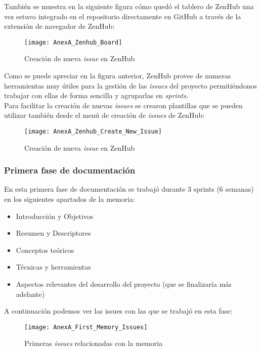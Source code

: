 También se muestra en la siguiente figura cómo quedó el tablero de ZenHub una vez estuvo integrado en el repositorio directamente en GitHub a través de la extensión de navegador de ZenHub:

\begin{figure}[!h]
	\centering
	\texttt{[image: AnexA\_Zenhub\_Board]}
	\caption{Creación de nueva \textit{issue} en ZenHub}
	\label{fig:AnexA_Zenhub_Board}
\end{figure}
\FloatBarrier

Como se puede apreciar en la figura anterior, ZenHub provee de numeras herramientas muy útiles para la gestión de las \textit{issues} del proyecto permitiéndonos trabajar con ellas de forma sencilla y agruparlas en \textit{sprints}.\\
Para facilitar la creación de nuevas \textit{issues} se crearon plantillas que se pueden utilizar también desde el menú de creación de \textit{issues} de ZenHub:

\begin{figure}[!h]
	\centering
	\texttt{[image: AnexA\_Zenhub\_Create\_New\_Issue]}
	\caption{Creación de nueva \textit{issue} en ZenHub}
	\label{fig:AnexA_Zenhub_Create_New_Issue}
\end{figure}
\FloatBarrier

\subsubsection{Primera fase de documentación}

En esta primera fase de documentación se trabajó durante 3 sprints (6 semanas) en los siguientes apartados de la memoria:

\begin{itemize}
	\item Introducción y Objetivos
	\item Resumen y Descriptores
	\item Conceptos teóricos
	\item Técnicas y herramientas
	\item Aspectos relevantes del desarrollo del proyecto (que se finalizaría más adelante)
\end{itemize}

A continuación podemos ver las issues con las que se trabajó en esta fase:

\begin{figure}[!h]
	\centering
	\texttt{[image: AnexA\_First\_Memory\_Issues]}
	\caption{Primeras \textit{issues} relacionadas con la memoria}
	\label{fig:AnexA_First_Memory_Issues}
\end{figure}
\FloatBarrier

